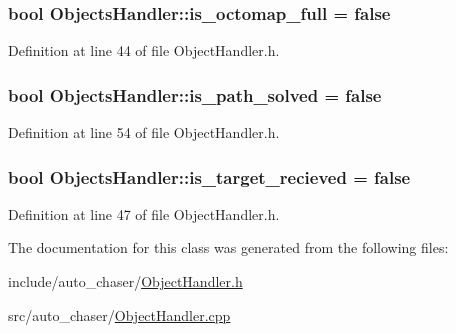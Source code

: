 \subsubsection[{\texorpdfstring{is\+\_\+octomap\+\_\+full}{is_octomap_full}}]{\setlength{\rightskip}{0pt plus 5cm}bool Objects\+Handler\+::is\+\_\+octomap\+\_\+full = false}\hypertarget{class_objects_handler_a56f70ac04c01e8b948a4b44fa5670f49}{}\label{class_objects_handler_a56f70ac04c01e8b948a4b44fa5670f49}


Definition at line 44 of file Object\+Handler.\+h.

\subsubsection[{\texorpdfstring{is\+\_\+path\+\_\+solved}{is_path_solved}}]{\setlength{\rightskip}{0pt plus 5cm}bool Objects\+Handler\+::is\+\_\+path\+\_\+solved = false}\hypertarget{class_objects_handler_ad8d1ea6646024f0a03e154a7c2c07682}{}\label{class_objects_handler_ad8d1ea6646024f0a03e154a7c2c07682}


Definition at line 54 of file Object\+Handler.\+h.

\subsubsection[{\texorpdfstring{is\+\_\+target\+\_\+recieved}{is_target_recieved}}]{\setlength{\rightskip}{0pt plus 5cm}bool Objects\+Handler\+::is\+\_\+target\+\_\+recieved = false}\hypertarget{class_objects_handler_a7691f3e1ec58e55ead30c50c555f169a}{}\label{class_objects_handler_a7691f3e1ec58e55ead30c50c555f169a}


Definition at line 47 of file Object\+Handler.\+h.



The documentation for this class was generated from the following files\+:\begin{DoxyCompactItemize}
\item 
include/auto\+\_\+chaser/\hyperlink{_object_handler_8h}{Object\+Handler.\+h}\item 
src/auto\+\_\+chaser/\hyperlink{_object_handler_8cpp}{Object\+Handler.\+cpp}\end{DoxyCompactItemize}
